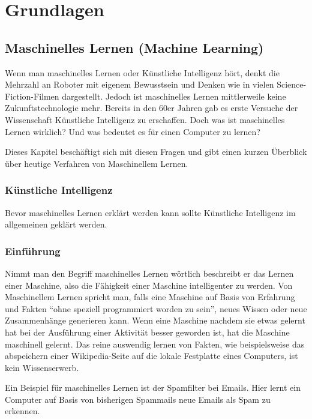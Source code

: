\chapter{Grundlagen}

\section{Maschinelles Lernen (Machine Learning)}

    Wenn man maschinelles Lernen oder Künstliche Intelligenz hört, denkt die Mehrzahl an Roboter mit eigenem Bewusstsein und Denken wie in vielen Science-Fiction-Filmen dargestellt.
    Jedoch ist maschinelles Lernen mittlerweile keine Zukunftstechnologie mehr.
    Bereits in den 60er Jahren gab es erste Versuche der Wissenschaft Künstliche Intelligenz zu erschaffen.
    Doch was ist maschinelles Lernen wirklich? Und was bedeutet es für einen Computer zu lernen?
    \newline

    \noindent
    Dieses Kapitel beschäftigt sich mit diesen Fragen und gibt einen kurzen Überblick über heutige Verfahren von Maschinellem Lernen.

    \subsection{Künstliche Intelligenz}
    Bevor maschinelles Lernen erklärt werden kann sollte Künstliche Intelligenz im allgemeinen geklärt werden.


    \subsection{Einführung}
    Nimmt man den Begriff maschinelles Lernen wörtlich beschreibt er das Lernen einer Maschine, also die Fähigkeit einer Maschine intelligenter zu werden.
    Von Maschinellem Lernen spricht man, falls eine Maschine auf Basis von Erfahrung und Fakten "`ohne speziell programmiert worden zu sein"'\cite[20]{HandsOnML}, neues Wissen oder neue Zusammenhänge generieren kann.
    Wenn eine Maschine nachdem sie etwas gelernt hat bei der Ausführung einer Aktivität besser geworden ist, hat die Maschine maschinell gelernt\cite[20]{HandsOnML}.
    Das reine auswendig lernen von Fakten, wie beispielsweise das abspeichern einer Wikipedia-Seite auf die lokale Festplatte eines Computers, ist kein Wissenserwerb.
    \newline

    \noindent
    Ein Beispiel für maschinelles Lernen ist der Spamfilter bei Emails.
    Hier lernt ein Computer auf Basis von bisherigen Spammails neue Emails als Spam zu erkennen.
    \newline

